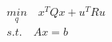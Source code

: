 \documentclass[preview]{standalone}
\begin{document}
\begin{align*}
\underset{q}{min} \quad x^TQx + u^T R u \\ s.t. \quad Ax = b
\end{align*}
\end{document}
